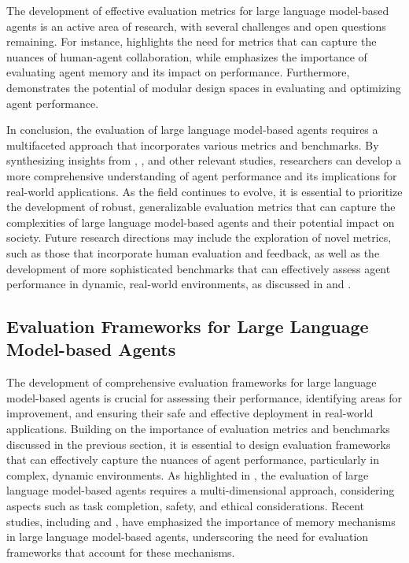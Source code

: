 \documentclass[11pt,a4paper]{article}
\begin{document}
The development of effective evaluation metrics for large language model-based agents is an active area of research, with several challenges and open questions remaining. For instance, \cite{arxiv:2402.12914} highlights the need for metrics that can capture the nuances of human-agent collaboration, while \cite{doi:10.1145/3748302} emphasizes the importance of evaluating agent memory and its impact on performance. Furthermore, \cite{arxiv:2410.06153} demonstrates the potential of modular design spaces in evaluating and optimizing agent performance.

In conclusion, the evaluation of large language model-based agents requires a multifaceted approach that incorporates various metrics and benchmarks. By synthesizing insights from \cite{arxiv:1906.09379}, \cite{arxiv:2308.03688}, and other relevant studies, researchers can develop a more comprehensive understanding of agent performance and its implications for real-world applications. As the field continues to evolve, it is essential to prioritize the development of robust, generalizable evaluation metrics that can capture the complexities of large language model-based agents and their potential impact on society. Future research directions may include the exploration of novel metrics, such as those that incorporate human evaluation and feedback, as well as the development of more sophisticated benchmarks that can effectively assess agent performance in dynamic, real-world environments, as discussed in \cite{doi:10.18653/v1/2023.acl-long.411} and \cite{arxiv:2306.03917}.


\subsection{Evaluation Frameworks for Large Language Model-based Agents}


The development of comprehensive evaluation frameworks for large language model-based agents is crucial for assessing their performance, identifying areas for improvement, and ensuring their safe and effective deployment in real-world applications. Building on the importance of evaluation metrics and benchmarks discussed in the previous section, it is essential to design evaluation frameworks that can effectively capture the nuances of agent performance, particularly in complex, dynamic environments. As highlighted in \cite{arxiv:2308.03688}, the evaluation of large language model-based agents requires a multi-dimensional approach, considering aspects such as task completion, safety, and ethical considerations. Recent studies, including \cite{doi:10.1145/3748302} and \cite{doi:10.1609/aaaiss.v2i1.27688}, have emphasized the importance of memory mechanisms in large language model-based agents, underscoring the need for evaluation frameworks that account for these mechanisms.
\end{document}
